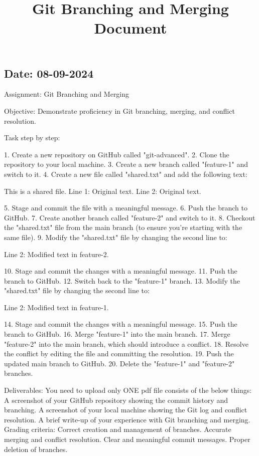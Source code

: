\documentclass[12pt]{article}
\begin{document}
\subsection*{Date: 08-09-2024}
\title{Git Branching and Merging{} Document}
Assignment: Git Branching and Merging

Objective: Demonstrate proficiency in Git branching, merging, and conflict resolution.

Task step by step:

1. Create a new repository on GitHub called "git-advanced".
2. Clone the repository to your local machine.
3. Create a new branch called "feature-1" and switch to it.
4. Create a new file called "shared.txt" and add the following text:

This is a shared file.
Line 1: Original text.
Line 2: Original text.

5. Stage and commit the file with a meaningful message.
6. Push the branch to GitHub.
7. Create another branch called "feature-2" and switch to it.
8. Checkout the "shared.txt" file from the main branch (to ensure you're starting with the same file).
9. Modify the "shared.txt" file by changing the second line to:

Line 2: Modified text in feature-2.

10. Stage and commit the changes with a meaningful message.
11. Push the branch to GitHub.
12. Switch back to the "feature-1" branch.
13. Modify the "shared.txt" file by changing the second line to:

Line 2: Modified text in feature-1.

14. Stage and commit the changes with a meaningful message.
15. Push the branch to GitHub.
16. Merge "feature-1" into the main branch.
17. Merge "feature-2" into the main branch, which should introduce a conflict.
18. Resolve the conflict by editing the file and committing the resolution.
19. Push the updated main branch to GitHub.
20. Delete the "feature-1" and "feature-2" branches.

Deliverables:
You need to upload only ONE pdf file consists of the below things:
A screenshot of your GitHub repository showing the commit history and branching.
A screenshot of your local machine showing the Git log and conflict resolution.
A brief write-up of your experience with Git branching and merging.
Grading criteria:
Correct creation and management of branches.
Accurate merging and conflict resolution.
Clear and meaningful commit messages.
Proper deletion of branches.
\newpage
\end{document}
